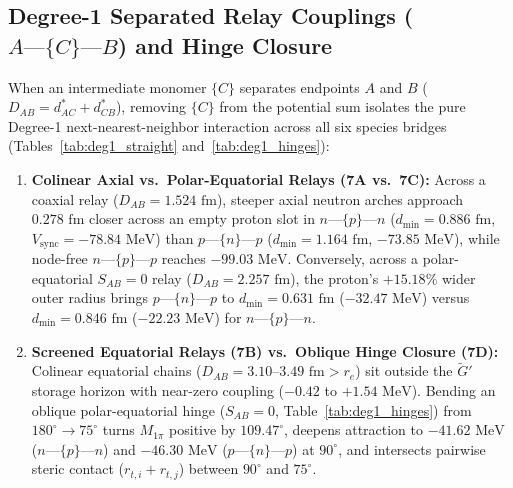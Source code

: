 \documentclass[11pt, a4paper]{article}
\DeclareRobustCommand{\dmin}{d_{\min}}
\begin{document}
\subsection{\texorpdfstring{Degree-1 Separated Relay Couplings ($A\text{---}\{C\}\text{---}B$) and Hinge Closure}{Degree-1 Separated Relay Couplings and Hinge Closure}}
\label{sec:degree1_relays}
When an intermediate monomer $\{C\}$ separates endpoints $A$ and $B$ ($D_{AB} = d^*_{AC} + d^*_{CB}$), removing $\{C\}$ from the potential sum isolates the pure Degree-1 next-nearest-neighbor interaction across all six species bridges (Tables~\ref{tab:deg1_straight} and~\ref{tab:deg1_hinges}):
\begin{enumerate}[leftmargin=1.8em, itemsep=2pt]
    \item \textbf{Colinear Axial vs.\ Polar-Equatorial Relays (7A vs.\ 7C):} Across a coaxial relay ($D_{AB} = 1.524\text{ fm}$), steeper axial neutron arches approach $0.278\text{ fm}$ closer across an empty proton slot in $n\text{---}\{p\}\text{---}n$ ($\dmin = 0.886\text{ fm}$, $V_{\mathrm{sync}} = -78.84\text{ MeV}$) than $p\text{---}\{n\}\text{---}p$ ($\dmin = 1.164\text{ fm}$, $-73.85\text{ MeV}$), while node-free $n\text{---}\{p\}\text{---}p$ reaches $-99.03\text{ MeV}$. Conversely, across a polar-equatorial $S_{AB} = 0$ relay ($D_{AB} = 2.257\text{ fm}$), the proton's $+15.18\%$ wider outer radius brings $p\text{---}\{n\}\text{---}p$ to $\dmin = 0.631\text{ fm}$ ($-32.47\text{ MeV}$) versus $\dmin = 0.846\text{ fm}$ ($-22.23\text{ MeV}$) for $n\text{---}\{p\}\text{---}n$.
    \item \textbf{Screened Equatorial Relays (7B) vs.\ Oblique Hinge Closure (7D):} Colinear equatorial chains ($D_{AB} = 3.10\text{--}3.49\text{ fm} > r_e$) sit outside the $\widetilde{G}'$ storage horizon with near-zero coupling ($-0.42$ to $+1.54\text{ MeV}$). Bending an oblique polar-equatorial hinge ($S_{AB} = 0$, Table~\ref{tab:deg1_hinges}) from $180^\circ \to 75^\circ$ turns $M_{1\pi}$ positive by $109.47^\circ$, deepens attraction to $-41.62\text{ MeV}$ ($n\text{---}\{p\}\text{---}n$) and $-46.30\text{ MeV}$ ($p\text{---}\{n\}\text{---}p$) at $90^\circ$, and intersects pairwise steric contact ($r_{t,i} + r_{t,j}$) between $90^\circ$ and $75^\circ$.
\end{enumerate}
\end{document}
